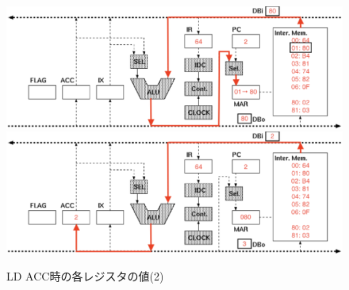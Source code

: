 \documentclass[dvipdfmx]{jsarticle}
\begin{document}
\begin{figure}[H]
    \begin{center}
        \includegraphics[scale=0.7]{img/ld3.eps}%
        \vspace{-2mm}
        \label{img:ld3}
    \vspace{1cm}
        \includegraphics[scale=0.7]{img/ld4.eps}%
        \vspace{-2mm}
        \label{img:ld4}
    \end{center}
    \caption{LD ACC時の各レジスタの値(2)}
    \label{ld2}
\end{figure}

\clearpage
\end{document}

